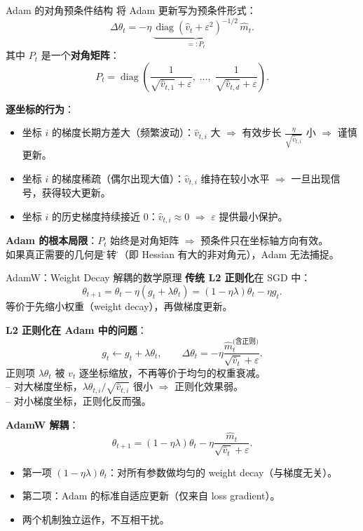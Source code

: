 \documentclass[aspectratio=169,10pt]{ctexbeamer}
\newcommand{\diag}{\operatorname{diag}}
\newcommand{\eps}{\varepsilon}
\begin{document}
\begin{frame}{Adam 的对角预条件结构}
将 Adam 更新写为预条件形式：
\[
  \Delta\theta_t=-\eta\,\underbrace{\diag(\hat v_t+\eps^2)^{-1/2}}_{=:P_t}\,\hat m_t.
\]
其中 $P_t$ 是一个\textbf{对角矩阵}：
\[
  P_t=\diag\!\left(\frac{1}{\sqrt{\hat v_{t,1}}+\eps},\;\ldots,\;\frac{1}{\sqrt{\hat v_{t,d}}+\eps}\right).
\]

\vspace{.25cm}
\textbf{逐坐标的行为}：
\begin{itemize}
  \item 坐标 $i$ 的梯度长期方差大（频繁波动）：$\hat v_{t,i}$ 大 $\Rightarrow$ 有效步长 $\frac{\eta}{\sqrt{\hat v_{t,i}}}$ 小 $\Rightarrow$ 谨慎更新。
  \item 坐标 $i$ 的梯度稀疏（偶尔出现大值）：$\hat v_{t,i}$ 维持在较小水平 $\Rightarrow$ 一旦出现信号，获得较大更新。
  \item 坐标 $i$ 的历史梯度持续接近 0：$\hat v_{t,i}\approx0$ $\Rightarrow$ $\eps$ 提供最小保护。
\end{itemize}

\vspace{.25cm}
\textbf{Adam 的根本局限}：$P_t$ 始终是对角矩阵 $\Rightarrow$ 预条件只在坐标轴方向有效。\\
如果真正需要的几何是\"旋转\"的（即 Hessian 有大的非对角元），Adam 无法捕捉。
\end{frame}

\begin{frame}{AdamW：Weight Decay 解耦的数学原理}
\textbf{传统 L2 正则化}在 SGD 中：
\[
  \theta_{t+1}=\theta_t-\eta(g_t+\lambda\theta_t)=(1-\eta\lambda)\theta_t-\eta g_t.
\]
等价于先缩小权重（weight decay），再做梯度更新。

\vspace{.25cm}
\textbf{L2 正则化在 Adam 中的问题}：
\[
  g_t\leftarrow g_t+\lambda\theta_t,\qquad
  \Delta\theta_t=-\eta\frac{\hat m_t^{\text{(含正则)}}}{\sqrt{\hat v_t}+\eps}.
\]
正则项 $\lambda\theta_t$ 被 $v_t$ 逐坐标缩放，不再等价于均匀的权重衰减。\\
-- 对大梯度坐标，$\lambda\theta_{t,i}/\sqrt{\hat v_{t,i}}$ 很小 $\Rightarrow$ 正则化效果弱。\\
-- 对小梯度坐标，正则化反而强。

\vspace{.25cm}
\textbf{AdamW 解耦}：
\[
  \boxed{\theta_{t+1}=(1-\eta\lambda)\theta_t-\eta\frac{\hat m_t}{\sqrt{\hat v_t}+\eps}.}
\]
\begin{itemize}
  \item 第一项 $(1-\eta\lambda)\theta_t$：对所有参数做均匀的 weight decay（与梯度无关）。
  \item 第二项：Adam 的标准自适应更新（仅来自 loss gradient）。
  \item 两个机制独立运作，不互相干扰。
\end{itemize}
\end{frame}
\end{document}
